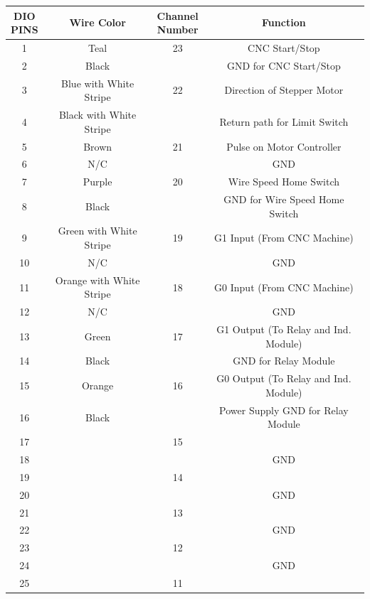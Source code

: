 \documentclass[12pt]{article}
\begin{document}
\begin{adjustwidth}{-2cm}{-2cm}


\begin{center}


\begin{tabular}{ |c|c|c|c| }


  \hline
  \thead{DIO \\ PINS} & \textbf{Wire Color} & \thead{Channel \\ Number} & \textbf{Function} \\ \hline
      
1 &	Teal &	23 &	CNC Start/Stop \\ \hline
2 &	Black &	&	GND for CNC Start/Stop \\ \hline
3 &	Blue with White Stripe &	22 &	Direction of Stepper Motor \\ \hline
4 &	Black with White Stripe &	 &	Return path for Limit Switch \\ \hline
5 &	Brown &	21 &	Pulse on Motor Controller \\ \hline
6 &	N/C & &		GND \\ \hline
7 &	Purple &	20 &	Wire Speed Home Switch \\ \hline
8 &	Black & &		GND for Wire Speed Home Switch \\ \hline
9 &	Green with White Stripe &	19 &	G1 Input (From CNC Machine) \\ \hline
10 &	N/C & &		GND \\ \hline
11 &	Orange with White Stripe &	18 &	G0 Input (From CNC Machine) \\ \hline
12 &	N/C & &		GND \\ \hline
13 &	Green &	17 &	G1 Output (To Relay and Ind. Module) \\ \hline
14 &	Black & &		GND for Relay Module \\ \hline
15 &	Orange &	16 &	G0 Output (To Relay and Ind. Module) \\ \hline
16 &	Black & &		Power Supply GND for Relay Module \\ \hline
17 & &		15	 & \\ \hline
18 & & 			& GND \\ \hline
19 & &		14 & \\ \hline	
20 & &			& GND \\ \hline
21 & &		13 & \\ \hline	
22 & &			& GND \\ \hline
23 & &		12 & \\ \hline	
24 & &			& GND \\ \hline
25 & &		11 & \\ \hline	



  
\end{tabular}





\end{center}

\end{adjustwidth}
\end{document}
